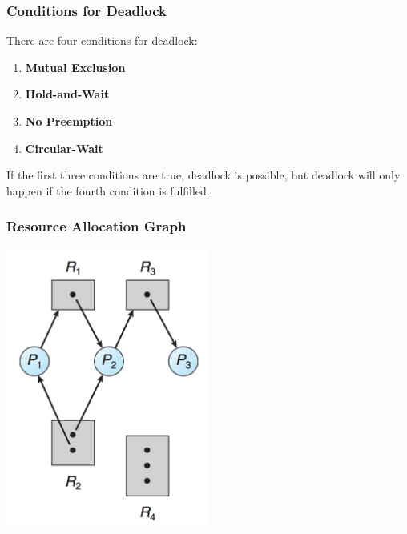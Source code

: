 \begin{frame}
	\frametitle{Conditions for Deadlock}
	There are four conditions for deadlock:

	\begin{enumerate}
		\item \textbf{Mutual Exclusion}
		\item \textbf{Hold-and-Wait}
		\item \textbf{No Preemption}
		\item \textbf{Circular-Wait}
	\end{enumerate}


	If the first three conditions are true, deadlock is possible, but deadlock will only happen if the fourth condition is fulfilled.


\end{frame}

\begin{frame}
	\frametitle{Resource Allocation Graph}

	\begin{center}
		\includegraphics[width=0.50\textwidth]{images/rag1.png}
	\end{center}

\end{frame}

